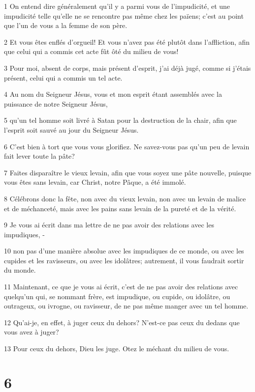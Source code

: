 \par 1 On entend dire généralement qu'il y a parmi vous de l'impudicité, et une impudicité telle qu'elle ne se rencontre pas même chez les païens; c'est au point que l'un de vous a la femme de son père.
\par 2 Et vous êtes enflés d'orgueil! Et vous n'avez pas été plutôt dans l'affliction, afin que celui qui a commis cet acte fût ôté du milieu de vous!
\par 3 Pour moi, absent de corps, mais présent d'esprit, j'ai déjà jugé, comme si j'étais présent, celui qui a commis un tel acte.
\par 4 Au nom du Seigneur Jésus, vous et mon esprit étant assemblés avec la puissance de notre Seigneur Jésus,
\par 5 qu'un tel homme soit livré à Satan pour la destruction de la chair, afin que l'esprit soit sauvé au jour du Seigneur Jésus.
\par 6 C'est bien à tort que vous vous glorifiez. Ne savez-vous pas qu'un peu de levain fait lever toute la pâte?
\par 7 Faites disparaître le vieux levain, afin que vous soyez une pâte nouvelle, puisque vous êtes sans levain, car Christ, notre Pâque, a été immolé.
\par 8 Célébrons donc la fête, non avec du vieux levain, non avec un levain de malice et de méchanceté, mais avec les pains sans levain de la pureté et de la vérité.
\par 9 Je vous ai écrit dans ma lettre de ne pas avoir des relations avec les impudiques, -
\par 10 non pas d'une manière absolue avec les impudiques de ce monde, ou avec les cupides et les ravisseurs, ou avec les idolâtres; autrement, il vous faudrait sortir du monde.
\par 11 Maintenant, ce que je vous ai écrit, c'est de ne pas avoir des relations avec quelqu'un qui, se nommant frère, est impudique, ou cupide, ou idolâtre, ou outrageux, ou ivrogne, ou ravisseur, de ne pas même manger avec un tel homme.
\par 12 Qu'ai-je, en effet, à juger ceux du dehors? N'est-ce pas ceux du dedans que vous avez à juger?
\par 13 Pour ceux du dehors, Dieu les juge. Otez le méchant du milieu de vous.

\chapter{6}

